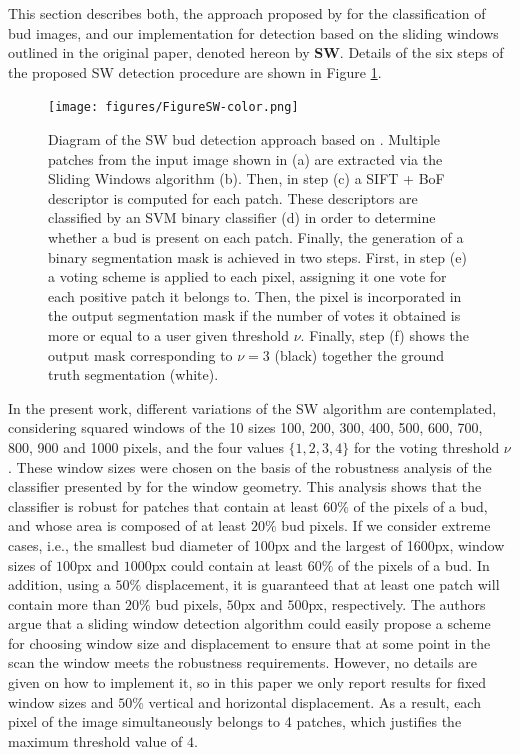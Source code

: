 \documentclass[a4paper,authoryear,review]{elsarticle}
\begin{document}
	This section describes both, the approach proposed by \citet{perez2017image} for the classification of bud images, and our implementation for detection based on the sliding windows outlined in the original paper, denoted hereon by \textbf{SW}. Details of the six steps of the proposed SW detection procedure are shown in Figure \ref{fig:SW}. 
	
	
	\begin{figure}
		\centering
		\texttt{[image: figures/FigureSW-color.png]}
		\caption{
			Diagram of the SW bud detection approach based on \citet{perez2017image}. Multiple patches from the input image shown in (a) are extracted via the Sliding Windows algorithm (b). Then, in step (c) a SIFT + BoF descriptor is computed for each patch. These descriptors are classified by an SVM binary classifier (d) in order to determine whether a bud is present on each patch. Finally, the generation of a binary segmentation mask is achieved in two steps. First, in step (e) a voting scheme is applied to each pixel, assigning it one vote for each positive patch it belongs to. Then, the pixel is incorporated in the output segmentation mask if the number of votes it obtained is more or equal to a user given threshold $\nu$. Finally, step (f) shows the output mask corresponding to $\nu=3$ (black) together the ground truth segmentation (white).}
		\label{fig:SW}
	\end{figure}
	
	In the present work, different variations of the SW algorithm are contemplated, considering squared windows of the 10 sizes 100, 200, 300, 400, 500, 600, 700, 800, 900 and 1000 pixels, and the four values $\{1, 2, 3, 4\}$ for the voting threshold $\nu$. 
	These window sizes were chosen on the basis of the robustness analysis of the classifier presented by \citet{perez2017image} for the window geometry. This analysis shows that the classifier is robust for patches that contain at least $60\%$ of the pixels of a bud, and whose area is composed of at least $20\%$ bud pixels. If we consider extreme cases, i.e., the smallest bud diameter of 100px and the largest of 1600px, window sizes of $100$px and $1000$px could contain at least $60\%$ of the pixels of a bud. In addition, using a $50\%$ displacement, it is guaranteed that at least one patch will contain more than $20\%$ bud pixels, $50$px and $500$px, respectively. The authors argue that a sliding window detection algorithm could easily propose a scheme for choosing window size and displacement to ensure that at some point in the scan the window meets the robustness requirements. 
	However, no details are given on how to implement it, so in this paper we only report results for fixed window sizes and $50\%$ vertical and horizontal displacement. As a result, each pixel of the image simultaneously belongs to 4 patches, which justifies the maximum threshold value of $4$. 
	
\end{document}
